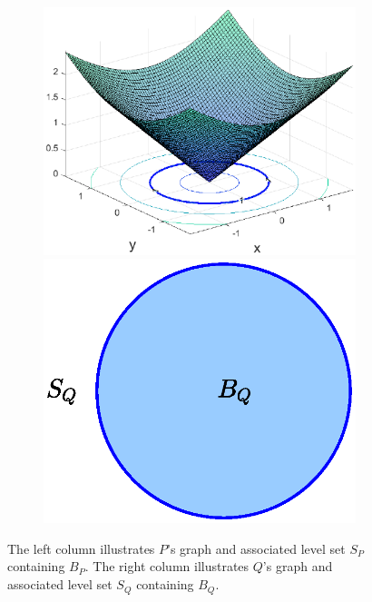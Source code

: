 \documentclass[11pt, letter]{book}
\newenvironment{example}
  {\pushQED{\qed}\renewcommand{\qedsymbol}{$\triangle$}\examplex}
  {\popQED\endexamplex}
\begin{document}
\begin{example}
\begin{figure}[!htb]
\begin{subfigure}{0.5\textwidth}
    \includegraphics[scale=0.6]{Fig2c.eps}
    \vspace{-10pt}
    \includegraphics[scale=0.6]{Fig2d.eps}
    \end{subfigure}
    \caption{The left column illustrates $P$'s graph and associated level set $S_P$ containing $B_P$. The right column illustrates $Q$'s graph and associated level set $S_Q$ containing $B_Q$.}
    \label{fig:Weierstrass}
\end{figure}
\end{example}
\end{document}
